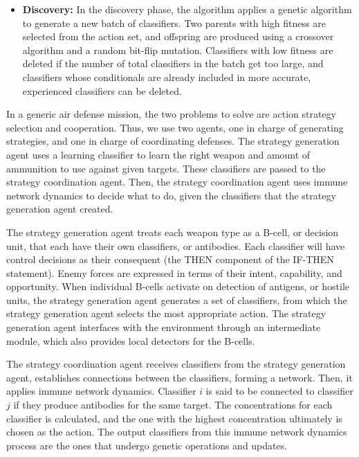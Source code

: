\documentclass[12pt]{article} %
\begin{document}
\begin{itemize}
        \item \textbf{Discovery:} In the discovery phase, the algorithm applies a genetic algorithm to generate a new batch of classifiers. Two parents with high fitness are selected from the action set, and offspring are produced using a crossover algorithm and a random bit-flip mutation. Classifiers with low fitness are deleted if the number of total classifiers in the batch get too large, and classifiers whose conditionals are already included in more accurate, experienced classifiers can be deleted.
    \end{itemize} 
     
    In a generic air defense mission, the two problems to solve are action strategy selection and cooperation. Thus, we use two agents, one in charge of generating strategies, and one in charge of coordinating defenses. The strategy generation agent uses a learning classifier to learn the right weapon and amount of ammunition to use against given targets. These classifiers are passed to the strategy coordination agent. Then, the strategy coordination agent uses immune network dynamics to decide what to do, given the classifiers that the strategy generation agent created. 

    The strategy generation agent treats each weapon type as a B-cell, or decision unit, that each have their own classifiers, or antibodies. Each classifier will have control decisions as their consequent (the THEN component of the IF-THEN statement). Enemy forces are expressed in terms of their intent, capability, and opportunity. When individual B-cells activate on detection of antigens, or hostile units, the strategy generation agent generates a set of classifiers, from which the strategy generation agent selects the most appropriate action. The strategy generation agent interfaces with the environment through an intermediate module, which also provides local detectors for the B-cells.

    The strategy coordination agent receives classifiers from the strategy generation agent, establishes connections between the classifiers, forming a network. Then, it applies immune network dynamics. Classifier $i$ is said to be connected to classifier $j$ if they produce antibodies for the same target. The concentrations for each classifier is calculated, and the one with the highest concentration ultimately is chosen as the action. The output classifiers from this immune network dynamics process are the ones that undergo genetic operations and updates. 
    
\end{document}
